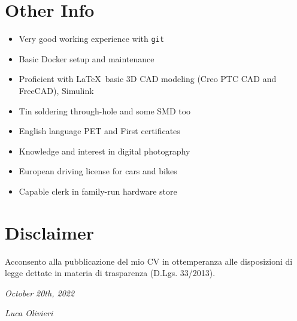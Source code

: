 \documentclass[]{friggeri-cv}
\begin{document}
\section{Other Info}
\vspace{-7pt}
\begin{itemize}
	\itemsep-0.2em
	\item Very good working experience with \verb|git|
	\item Basic Docker setup and maintenance
	\item Proficient with \LaTeX\, basic 3D CAD modeling (Creo PTC CAD and FreeCAD), Simulink
	\item Tin soldering through-hole and some SMD too
	\item English language PET and First certificates
	\item Knowledge and interest in digital photography
	\item European driving license for cars and bikes	
	\item Capable clerk in family-run hardware store	
\end{itemize}

\section{Disclaimer}
Acconsento alla pubblicazione del mio CV in ottemperanza alle disposizioni di legge dettate in materia di trasparenza (D.Lgs. 33/2013).

\begin{flushleft}
\emph{October 20th, 2022}
\end{flushleft}
\begin{flushright}
\emph{Luca Olivieri}
\end{flushright}
\end{document}
